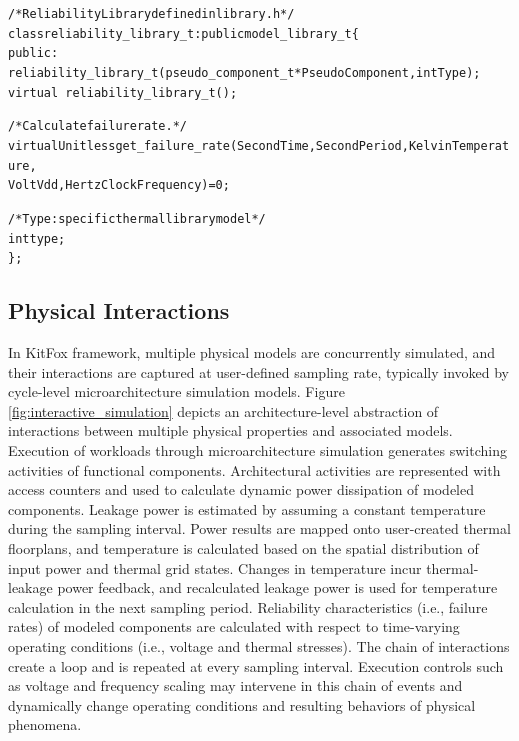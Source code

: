 {
\fontsize{10pt}{11pt}\selectfont
\begin{alltt}
/* Reliability Library defined in library.h */
class reliability_library_t : public model_library_t \{
public:
    reliability_library_t(pseudo_component_t *PseudoComponent, int Type);
    virtual ~reliability_library_t();

    /* Calculate failure rate. */
    virtual Unitless get_failure_rate(Second Time, Second Period, Kelvin Temperature, 
                                      Volt Vdd, Hertz ClockFrequency)=0;

    /* Type: specific thermal library model */
    int type;
\};
\end{alltt}
}

\subsection{Physical Interactions} \label{subsec:physical_interactions}
\noindent
In KitFox framework, multiple physical models are concurrently simulated, and their interactions are captured at user-defined sampling rate, typically invoked by cycle-level microarchitecture simulation models.
Figure \ref{fig:interactive_simulation} depicts an architecture-level abstraction of interactions between multiple physical properties and associated models.
Execution of workloads through microarchitecture simulation generates switching activities of functional components. 
Architectural activities are represented with access counters and used to calculate dynamic power dissipation of modeled components.
Leakage power is estimated by assuming a constant temperature during the sampling interval.
Power results are mapped onto user-created thermal floorplans, and temperature is calculated based on the spatial distribution of input power and thermal grid states.
Changes in temperature incur thermal-leakage power feedback, and recalculated leakage power is used for temperature calculation in the next sampling period. 
Reliability characteristics (i.e., failure rates) of modeled components are calculated with respect to time-varying operating conditions (i.e., voltage and thermal stresses).
The chain of interactions create a loop and is repeated at every sampling interval.
Execution controls such as voltage and frequency scaling may intervene in this chain of events and dynamically change operating conditions and resulting behaviors of physical phenomena.

